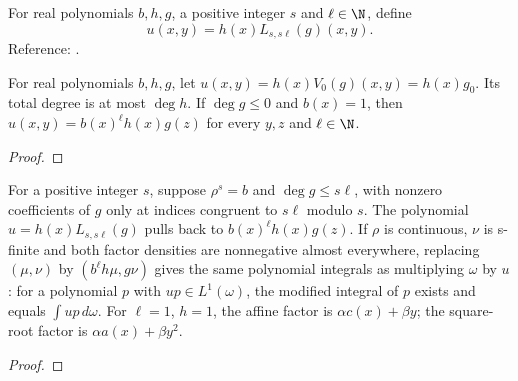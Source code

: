 \begin{supporting}
\begin{definition}
\label{def:koornwinder-modification-polynomial}
\leanok
For real polynomials $b,h,g$, a positive integer $s$ and $\ell\in\N$, define
\[
 u(x,y)=h(x)L_{s,s\ell}(g)(x,y).
\]
Reference: \cite[\S2.6.1]{dunkl-xu}.
\end{definition}

\begin{theorem}
\label{thm:koornwinder-zero-step}
\leanok
For real polynomials $b,h,g$, let $u(x,y)=h(x)V_0(g)(x,y)=h(x)g_0$.
Its total degree is at most $\deg h$. If $\deg g\le0$ and $b(x)=1$, then
$u(x,y)=b(x)^\ell h(x)g(z)$ for every $y,z$ and $\ell\in\N$.
\end{theorem}
\begin{proof}
\leanok
\end{proof}

\begin{theorem}
\label{thm:koornwinder-separated-density}
\leanok
For a positive integer $s$, suppose $\rho^s=b$ and $\deg g\le s\ell$, with nonzero coefficients of
$g$ only at indices congruent to $s\ell$ modulo $s$.
The polynomial $u=h(x)L_{s,s\ell}(g)$ pulls back to
$b(x)^\ell h(x)g(z)$. If $\rho$ is continuous, $\nu$ is s-finite and both
factor densities are nonnegative almost everywhere, replacing $(\mu,\nu)$ by $(b^\ell h\mu,g\nu)$ gives the same
polynomial integrals as multiplying $\omega$ by $u$: for a polynomial $p$ with
$up\in L^1(\omega)$, the modified integral of $p$ exists and equals
$\int up\,d\omega$.
For $\ell=1$, $h=1$, the affine factor is $\alpha c(x)+\beta y$;
the square-root factor is $\alpha a(x)+\beta y^2$.
\end{theorem}
\begin{proof}
\leanok
\end{proof}
\end{supporting}



